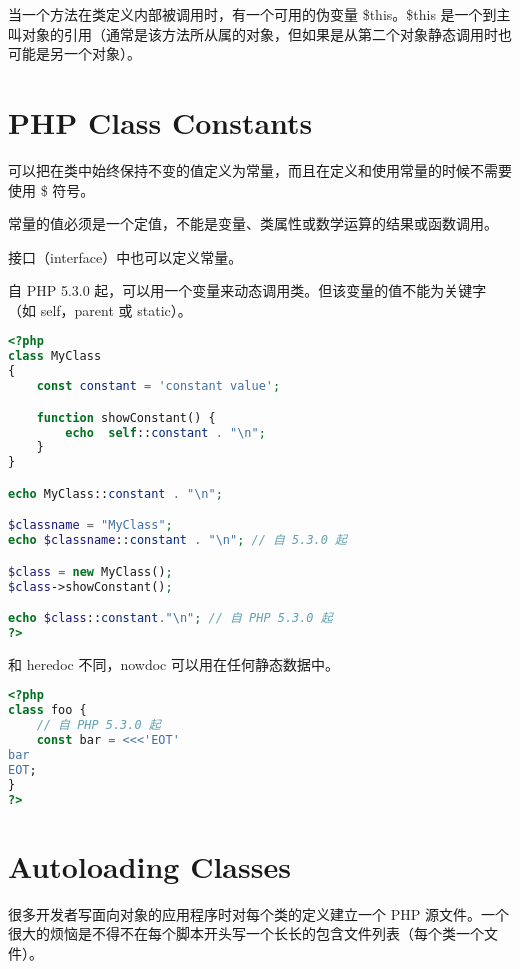 当一个方法在类定义内部被调用时，有一个可用的伪变量 \$this。\$this 是一个到主叫对象的引用（通常是该方法所从属的对象，但如果是从第二个对象静态调用时也可能是另一个对象）。






\chapter{PHP Class Constants}


可以把在类中始终保持不变的值定义为常量，而且在定义和使用常量的时候不需要使用 \$ 符号。

常量的值必须是一个定值，不能是变量、类属性或数学运算的结果或函数调用。

接口（interface）中也可以定义常量。

自 PHP 5.3.0 起，可以用一个变量来动态调用类。但该变量的值不能为关键字（如 self，parent 或 static）。





\begin{lstlisting}[language=PHP]
<?php
class MyClass
{
    const constant = 'constant value';

    function showConstant() {
        echo  self::constant . "\n";
    }
}

echo MyClass::constant . "\n";

$classname = "MyClass";
echo $classname::constant . "\n"; // 自 5.3.0 起

$class = new MyClass();
$class->showConstant();

echo $class::constant."\n"; // 自 PHP 5.3.0 起
?>
\end{lstlisting}

和 heredoc 不同，nowdoc 可以用在任何静态数据中。





\begin{lstlisting}[language=PHP]
<?php
class foo {
    // 自 PHP 5.3.0 起
    const bar = <<<'EOT'
bar
EOT;
}
?>
\end{lstlisting}


\chapter{Autoloading Classes}

很多开发者写面向对象的应用程序时对每个类的定义建立一个 PHP 源文件。一个很大的烦恼是不得不在每个脚本开头写一个长长的包含文件列表（每个类一个文件）。


